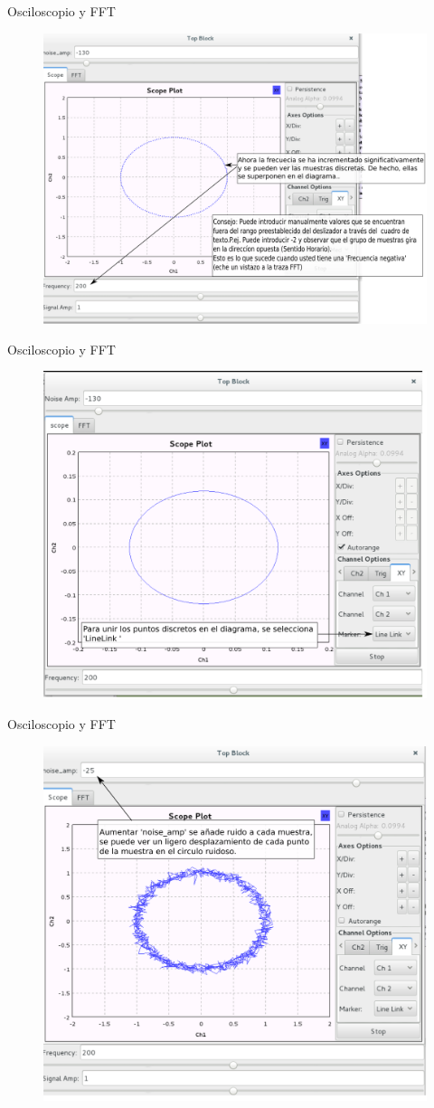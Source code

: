 \begin{frame}{Osciloscopio y FFT}
\begin{figure}[H]
\centering
\includegraphics[width=\textwidth, height=0.58\textwidth]{lab2/pdf/lab218.pdf}
\end{figure}
\end{frame}

\begin{frame}{Osciloscopio y FFT}
\begin{figure}[H]
\centering
\includegraphics[width=\textwidth, height=0.58\textwidth]{lab2/pdf/lab219.pdf}
\end{figure}
\end{frame}

\begin{frame}{Osciloscopio y FFT}
\begin{figure}[H]
\centering
\includegraphics[width=\textwidth, height=0.58\textwidth]{lab2/pdf/lab220.pdf}
\end{figure}
\end{frame}